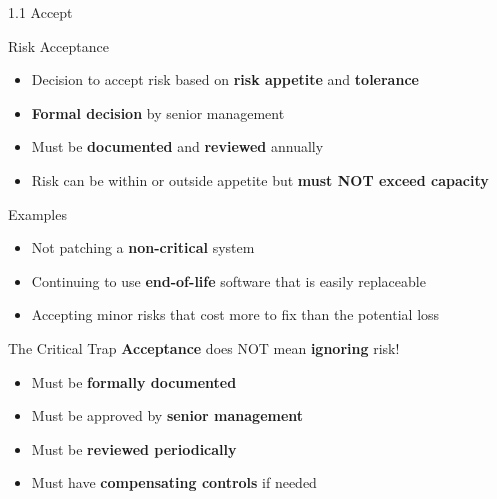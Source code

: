 \documentclass{beamer}
\begin{document}
	\begin{frame}{1.1 Accept}
		\begin{block}{Risk Acceptance}
			\begin{itemize}
				\item Decision to accept risk based on \textbf{risk appetite} and \textbf{tolerance}
				\item \textbf{Formal decision} by senior management
				\item Must be \textbf{documented} and \textbf{reviewed} annually
				\item Risk can be within or outside appetite but \textbf{must NOT exceed capacity}
			\end{itemize}
		\end{block}
		
		\begin{block}{Examples}
			\begin{itemize}
				\item Not patching a \textbf{non-critical} system
				\item Continuing to use \textbf{end-of-life} software that is easily replaceable
				\item Accepting minor risks that cost more to fix than the potential loss
			\end{itemize}
		\end{block}
		
		\begin{alertblock}{The Critical Trap}
			\textbf{Acceptance} does NOT mean \textbf{ignoring} risk!
			\begin{itemize}
				\item Must be \textbf{formally documented}
				\item Must be approved by \textbf{senior management}
				\item Must be \textbf{reviewed periodically}
				\item Must have \textbf{compensating controls} if needed
			\end{itemize}
		\end{alertblock}
	\end{frame}
	
\end{document}
